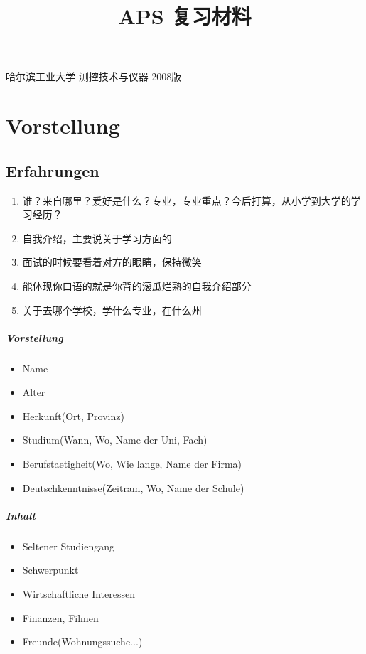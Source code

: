 \documentclass[b5paper, twoside]{ctexbook}
\title{APS 复习材料}
\begin{document}
\maketitle
哈尔滨工业大学 测控技术与仪器 2008版
\tableofcontents
\chapter{Vorstellung}
\section{Erfahrungen}
\begin{enumerate}
  \item 谁？来自哪里？爱好是什么？专业，专业重点？今后打算，从小学到大学的学习经历？
  \item 自我介绍，主要说关于学习方面的
  \item 面试的时候要看着对方的眼睛，保持微笑
  \item 能体现你口语的就是你背的滚瓜烂熟的自我介绍部分
  \item 关于去哪个学校，学什么专业，在什么州
\end{enumerate}

\paragraph{Vorstellung}
\begin{itemize}
  \item Name
  \item Alter
  \item Herkunft(Ort, Provinz)
  \item Studium(Wann, Wo, Name der Uni, Fach)
  \item Berufstaetigheit(Wo, Wie lange, Name der Firma)
  \item Deutschkenntnisse(Zeitram, Wo, Name der Schule)\footnotemark
\end{itemize}

\paragraph{Inhalt}
\begin{itemize}
  \item Seltener Studiengang
  \item Schwerpunkt
  \item Wirtschaftliche Interessen
  \item Finanzen, Filmen
  \item Freunde(Wohnungssuche...)
\end{itemize}
\end{document}
